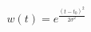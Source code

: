 \begin{equation}\label{eq:}
    w(t)=e^{\frac{(t-t_0)^2}{2\sigma^2}}
\end{equation}
%
%
%
%
%    
%    
%    
%    
%    



